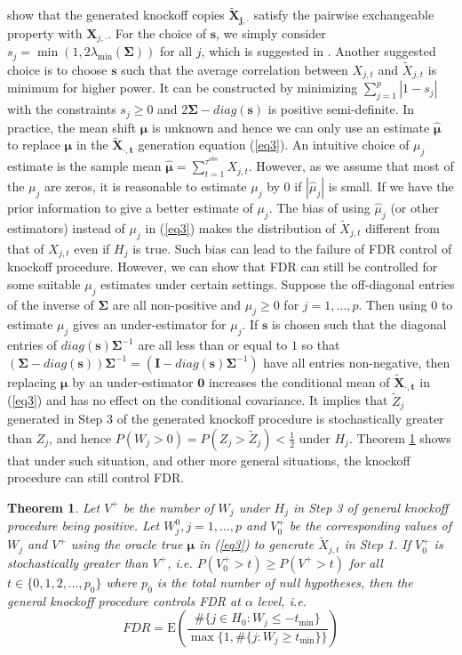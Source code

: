 \documentclass[a4paper,12pt]{article}
\newtheorem{theorem}{Theorem}
\newcommand{\E}{\mathrm{E}}
\begin{document}
\cite{barber2015controlling} show that the generated knockoff copies $\bm{\tilde X_{j, \cdot}}$ satisfy the pairwise exchangeable property with $\bm X_{j, \cdot}$. For the choice of $\bm s$, we simply consider $s_j = \min \left(1, 2 \lambda_{\min}(\bm \Sigma)\right)$ for all $j$, which is suggested in \cite{barber2015controlling}. Another suggested choice is to choose $\bm s$ such that the average correlation between $X_{j,t}$ and $\tilde X_{j,t}$ is minimum for higher power. It can be constructed by minimizing $\sum_{j=1}^p |1 - s_j|$ with the constraints $s_j \ge 0$ and $2 \bm \Sigma - diag(\bm s)$ is positive semi-definite. In practice, the mean shift $\bm \mu$ is unknown and hence we can only use an estimate $\bm{\hat \mu}$ to replace $\bm \mu$ in the $\bm{\tilde X_{\cdot,t}}$ generation equation (\ref{eq3}). An intuitive choice of $\mu_j$ estimate is the sample mean $\bm{\hat \mu} = \sum_{t=1}^{\tau^{obs}} X_{j,t}$. However, as we assume that most of the $\mu_j$ are zeros, it is reasonable to estimate $\mu_j$ by 0 if $|\hat \mu_j|$ is small. If we have the prior information to give a better estimate of $\mu_j$. The bias of using $\hat \mu_j$ (or other estimators) instead of $\mu_j$ in (\ref{eq3}) makes the distribution of $\tilde X_{j,t}$ different from that of $X_{j,t}$ even if $H_j$ is true. Such bias can lead to the failure of FDR control of knockoff procedure. However, we can show that FDR can still be controlled for some suitable $\mu_j$ estimates under certain settings. Suppose the off-diagonal entries of the inverse of $\bm \Sigma$ are all non-positive and $\mu_j \ge 0$ for $j=1, \ldots, p$. Then using 0 to estimate $\mu_j$ gives an under-estimator for $\mu_j$. If $\bm s$ is chosen such that the diagonal entries of $diag(\bm s) \bm \Sigma^{-1}$ are all less than or equal to $1$ so that $(\bm \Sigma - diag (\bm s)) \bm \Sigma^{-1} = (\bm I - diag(\bm s) \bm \Sigma^{-1})$ have all entries non-negative, then replacing $\bm \mu$ by an under-estimator $\bm 0$ increases the conditional mean of $\bm{\tilde X_{\cdot, t}}$ in (\ref{eq3}) and has no effect on the conditional covariance. It implies that $\tilde Z_j$ generated in Step 3 of the generated knockoff procedure is stochastically greater than $Z_j$, and hence $P(W_j > 0) = P(Z_j > \tilde Z_j) < \frac{1}{2}$ under $H_j$. Theorem \ref{theo1} shows that under such situation, and other more general situations, the knockoff procedure can still control FDR.
\begin{theorem}\label{theo1}
Let $V^+$ be the number of $W_j$ under $H_j$ in Step 3 of general knockoff procedure being positive. Let $W_j^0, j=1, \ldots, p$ and $V_0^+$ be the corresponding values of $W_j$ and $V^+$ using the oracle true $\bm \mu$ in (\ref{eq3}) to generate $\tilde X_{j,t}$ in Step 1. If $V_0^+$ is stochastically greater than $V^+$, i.e. $P(V_0^+ > t) \ge P(V^+ > t)$ for all $t \in \{0, 1, 2, \ldots, p_0\}$ where $p_0$ is the total number of null hypotheses, then the general knockoff procedure controls FDR at $\alpha$ level, i.e.
\begin{equation}\label{eq4}
FDR = \E \left ( \frac{\# \{j \in H_0: W_j \le -t_{\min}\}}{\max \{1, \# \{j: W_j \ge t_{\min}\}\}}\right )
\end{equation}
\end{theorem}
\end{document}
